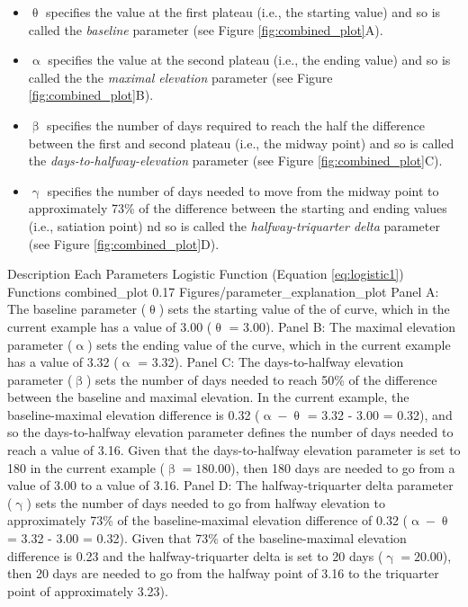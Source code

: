 \documentclass[
12pt, %
twoside,
english]{guelphthesis}
\begin{document}
\begin{itemize}
\tightlist
\item
  \(\uptheta\) specifies the value at the first plateau (i.e., the starting value) and so is called the \emph{baseline} parameter (see Figure \ref{fig:combined_plot}A).
\item
  \(\upalpha\) specifies the value at the second plateau (i.e., the ending value) and so is called the the \emph{maximal elevation} parameter (see Figure \ref{fig:combined_plot}B).
\item
  \(\upbeta\) specifies the number of days required to reach the half the difference between the first and second plateau (i.e., the midway point) and so is called the \emph{days-to-halfway-elevation} parameter (see Figure \ref{fig:combined_plot}C).
\item
  \(\upgamma\) specifies the number of days needed to move from the midway point to approximately 73\% of the difference between the starting and ending values (i.e., satiation point) nd so is called the \emph{halfway-triquarter delta} parameter (see Figure \ref{fig:combined_plot}D).
\end{itemize}
\begin{apaFigure}
[landscape]
[samepage]
[0cm]
{Description Each Parameters Logistic Function (Equation \ref{eq:logistic1}) Functions}
{combined_plot}
{0.17}
{Figures/parameter_explanation_plot}
{Panel A: The baseline parameter ($\uptheta$) sets the starting value of the of curve, which in the current example has a value of 3.00 ($\uptheta$ = 3.00). Panel B: The maximal elevation parameter ($\upalpha$) sets the ending value of the curve, which in the current example has a value of 3.32 ($\upalpha$ = 3.32). Panel C: The days-to-halfway elevation parameter ($\upbeta$) sets the number of days needed to reach 50\% of the difference between the baseline and maximal elevation. In the current example, the baseline-maximal elevation difference is 0.32 ($\upalpha - \uptheta$ = 3.32 - 3.00 = 0.32), and so the days-to-halfway elevation parameter defines the number of days needed to reach a value of 3.16. Given that the days-to-halfway elevation parameter is set to 180 in the current example ($\upbeta = 180.00$), then 180 days are needed to go from a value of 3.00 to a value of 3.16. Panel D: The halfway-triquarter delta parameter ($\upgamma$) sets the number of days needed to go from halfway elevation to approximately 73\% of the baseline-maximal elevation difference of 0.32 ($\upalpha - \uptheta$ = 3.32 - 3.00 = 0.32). Given that 73\% of the baseline-maximal elevation difference is 0.23 and the halfway-triquarter delta is set to 20 days ($\upgamma = 20.00$), then 20 days are needed to go from the halfway point of 3.16 to the triquarter point of approximately 3.23).}
\end{apaFigure}
\end{document}

